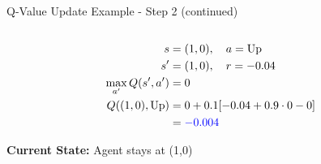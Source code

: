 \documentclass[aspectratio=169]{beamer}
\begin{document}
\begin{frame}{Q-Value Update Example - Step 2 (continued)}
\begin{columns}
        \begin{column}{0.5\textwidth}
            
            \begin{align}
                s &= (1,0), \quad a = \text{Up} \\
                s' &= (1,0), \quad r = -0.04 \\
                \max_{a'}Q(s',a') &= 0 \\
                Q((1,0),\text{Up}) &= 0 + 0.1[-0.04 + 0.9 \cdot 0 - 0] \\
                &= \textcolor{blue}{-0.004}
            \end{align}
            
            \vspace{0.5cm}
            \textbf{Current State:} Agent stays at (1,0)
        \end{column}
    \end{columns}
\end{frame}
\end{document}
